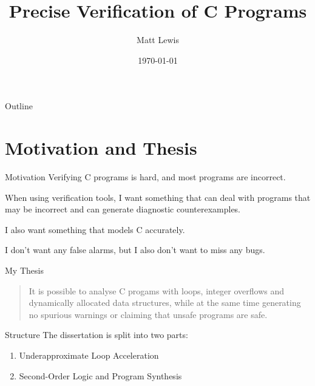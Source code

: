 \documentclass[xcolor=pdftex,t,11pt]{beamer}
\author{Matt Lewis}
\title{Precise Verification of C Programs}
\institute{Oxford University}
\date{\today}
\begin{document}

\begin{frame}[plain]
  \titlepage
\end{frame}

\begin{frame}{Outline}
  \tableofcontents
\end{frame}

\section{Motivation and Thesis}

\begin{frame}{Motivation}
 Verifying C programs is hard, and most programs are incorrect.
 
 \vspace{1em}
 
 When using verification tools, I want something that can deal with programs that may be incorrect and can generate diagnostic counterexamples.
 
 \vspace{1em}
 
 I also want something that models C accurately.
 
 \vspace{1em}
 
 I don't want any false alarms, but I also don't want to miss any bugs.
\end{frame}

\begin{frame}{My Thesis}
 \begin{quote}
  It is possible to analyse C progams with loops, integer overflows and dynamically allocated data structures,
while at the same time generating no spurious warnings or claiming that unsafe programs are safe.
 \end{quote}
\end{frame}

\begin{frame}{Structure}
 The dissertation is split into two parts:
 
 \vspace{1em}
 
 \begin{enumerate}
  \item Underapproximate Loop Acceleration
  \item Second-Order Logic and Program Synthesis
 \end{enumerate}

\end{frame}
\end{document}
